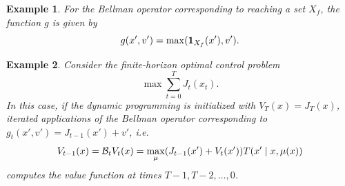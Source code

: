 \documentclass[conference]{IEEEtran}
\newtheorem{example}{Example}
\begin{document}
\begin{example}
  For the Bellman operator corresponding to reaching a set $X_f$, the function $g$ is given by
  \begin{equation*}
    g(x', v') = \max( \mathbf{1}_{X_f}(x'), v').
  \end{equation*}
\end{example}

\begin{example}
  Consider the finite-horizon optimal control problem 
  \begin{equation}
     \max \sum_{t=0}^T J_t(x_t).
  \end{equation} 
  In this case, if the dynamic programming is initialized with $V_T(x) = J_T(x)$, iterated applications of the Bellman operator corresponding to $g_t(x', v') = J_{t-1}(x') + v'$, i.e.
  \begin{equation*}
    V_{t-1}(x) = \mathcal{B}_t V_{t} (x) = \max_{\mu} (J_{t-1}(x') + V_{t}(x')) T(x' \mid x, \mu(x))
  \end{equation*}
  computes the value function at times $T-1, T-2, \ldots, 0$.
\end{example}
\end{document}
